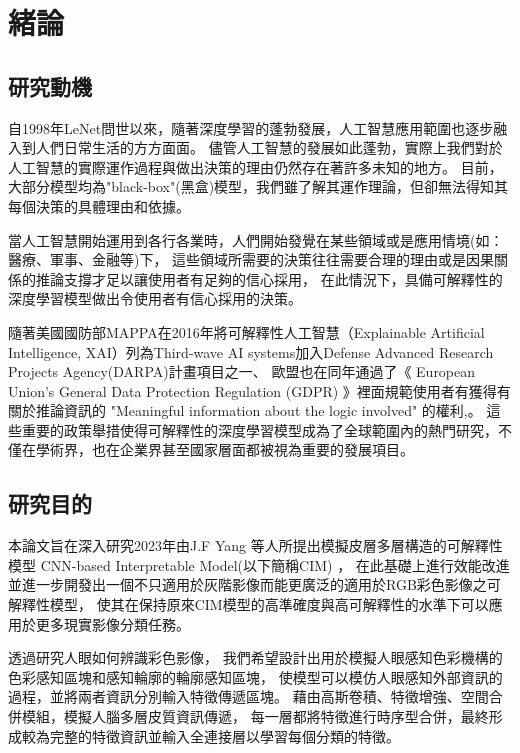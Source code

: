 \documentclass[class=NCU_thesis, crop=false]{standalone}
\begin{document}
\chapter{緒論}
\section{研究動機}

自1998年LeNet\cite{726791}問世以來，隨著深度學習的蓬勃發展，人工智慧應用範圍也逐步融入到人們日常生活的方方面面。
儘管人工智慧的發展如此蓬勃，實際上我們對於人工智慧的實際運作過程與做出決策的理由仍然存在著許多未知的地方。
目前，大部分模型均為"black-box"(黑盒)模型，我們雖了解其運作理論，但卻無法得知其每個決策的具體理由和依據。

當人工智慧開始運用到各行各業時，人們開始發覺在某些領域或是應用情境(如：醫療、軍事、金融等)下，
這些領域所需要的決策往往需要合理的理由或是因果關係的推論支撐才足以讓使用者有足夠的信心採用，
在此情況下，具備可解釋性的深度學習模型做出令使用者有信心採用的決策。

隨著美國國防部MAPPA在2016年將可解釋性人工智慧（Explainable Artificial Intelligence, XAI）列為Third-wave AI systems加入Defense Advanced Research Projects Agency(DARPA)計畫項目之一\cite{DARPA}、
歐盟也在同年通過了《 European Union's General Data Protection Regulation (GDPR) 》裡面規範使用者有獲得有關於推論資訊的 "Meaningful information about the logic involved" 的權利\cite{GDPR2016a},\cite{doi:10.1080/13600834.2019.1573501}。 這些重要的政策舉措使得可解釋性的深度學習模型成為了全球範圍內的熱門研究，不僅在學術界，也在企業界甚至國家層面都被視為重要的發展項目。

\pagebreak
\section{研究目的}
本論文旨在深入研究2023年由J.F Yang 等人所提出模擬皮層多層構造的可解釋性模型 CNN-based Interpretable Model(以下簡稱CIM) \cite{YangCNNInterpretable}，
在此基礎上進行效能改進並進一步開發出一個不只適用於灰階影像而能更廣泛的適用於RGB彩色影像之可解釋性模型，
使其在保持原來CIM模型的高準確度與高可解釋性的水準下可以應用於更多現實影像分類任務。

透過研究人眼如何辨識彩色影像，
我們希望設計出用於模擬人眼感知色彩機構的色彩感知區塊和感知輪廓的輪廓感知區塊，
使模型可以模仿人眼感知外部資訊的過程，並將兩者資訊分別輸入特徵傳遞區塊。
藉由高斯卷積、特徵增強、空間合併模組，模擬人腦多層皮質資訊傳遞，
每一層都將特徵進行時序型合併，最終形成較為完整的特徵資訊並輸入全連接層以學習每個分類的特徵。
\end{document}
